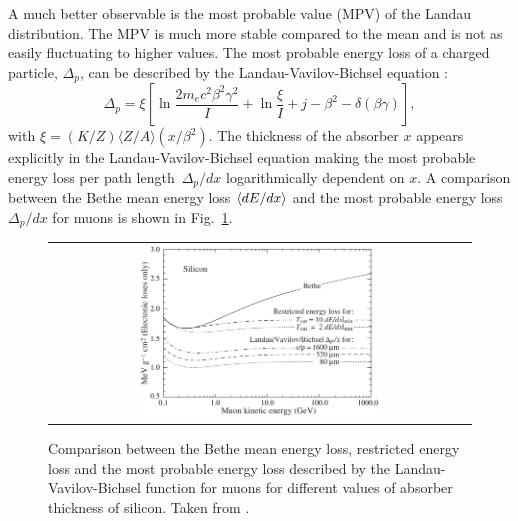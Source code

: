 A much better observable is the most probable value (MPV) of the Landau distribution.
The MPV is much more stable compared to the mean and is not as easily fluctuating to higher \dedx values. 
The most probable energy loss of a charged particle, $\Delta_p$, can be described by the Landau-Vavilov-Bichsel equation \cite{bib:Bichsel:MPV_1988}:
\begin{equation}
\Delta_p = \xi \left[ \ln \frac{2m_e c^2\beta^2\gamma^2}{I}  + \ln\frac{\xi}{I} + j - \beta^2 - \delta(\beta\gamma)  \right],
\label{eq:Landau_Vavilov_Bichsel}
\end{equation}
with $\xi=(K/Z)\langle Z/A \rangle (x/\beta^2)$. 
The thickness of the absorber $x$ appears explicitly in the Landau-Vavilov-Bichsel equation making the most probable energy loss per path \mbox{length $\Delta_p/dx$} logarithmically dependent on $x$.
A comparison between the Bethe mean energy loss $\langle dE/dx \rangle$ and the most probable energy loss $\Delta_p/dx$ for muons is shown in Fig.~\ref{fig:dEdx_Bethe_Landau}.
\begin{figure}[!bt]
  \centering 
  \begin{tabular}{c}
  \includegraphics[width=0.6\textwidth]{figures/analysis/dEdx_Bethe_Landau.png}
  \end{tabular}
  \caption{Comparison between the Bethe mean energy loss, restricted energy loss and the most probable energy loss described by the Landau-Vavilov-Bichsel function for muons for different values of absorber thickness of silicon. Taken from \cite{bib:PDG_2014}.} 
  \label{fig:dEdx_Bethe_Landau}
\end{figure}

